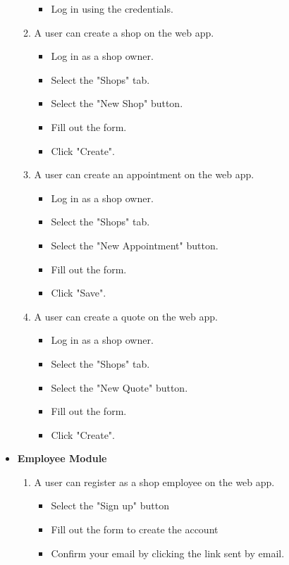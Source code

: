 \documentclass[12pt, titlepage]{article}
\begin{document}
\begin{itemize}
\begin{enumerate}
\begin{itemize}
            \item Log in using the credentials.
        \end{itemize}
        \item A user can create a shop on the web app.
        \begin{itemize}
            \item Log in as a shop owner.
            \item Select the "Shops" tab.
            \item Select the "New Shop" button.
            \item Fill out the form.
            \item Click "Create".
        \end{itemize}
        \item A user can create an appointment on the web app.
        \begin{itemize}
            \item Log in as a shop owner.
            \item Select the "Shops" tab.
            \item Select the "New Appointment" button.
            \item Fill out the form.
            \item Click "Save".
        \end{itemize}
        \item A user can create a quote on the web app.
        \begin{itemize}
            \item Log in as a shop owner.
            \item Select the "Shops" tab.
            \item Select the "New Quote" button.
            \item Fill out the form.
            \item Click "Create".
        \end{itemize}
    \end{enumerate}
    \item \textbf{Employee Module}
    \begin{enumerate}
        \item A user can register as a shop employee on the web app.
        \begin{itemize}
            \item Select the "Sign up" button
            \item Fill out the form to create the account
            \item Confirm your email by clicking the link sent by email.

\end{itemize}
\end{enumerate}
\end{itemize}
\end{document}
